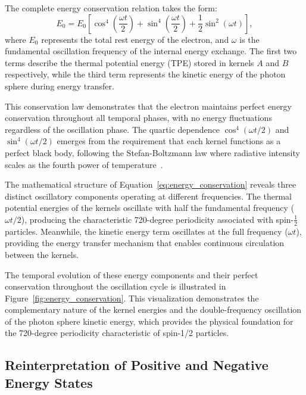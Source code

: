 \documentclass[%
 reprint,
 amsmath,amssymb,
 aps,
]{revtex4-1}
\numberwithin{equation}{section}%
\begin{document}
The complete energy conservation relation takes the form:
\begin{equation}
\boxed{E_0 = E_0\left[\cos^4\left(\frac{\omega t}{2}\right) + \sin^4\left(\frac{\omega t}{2}\right) + \frac{1}{2}\sin^2(\omega t)\right]}, \label{eq:energy_conservation}
\end{equation}
where $E_0$ represents the total rest energy of the electron, and $\omega$ is the fundamental oscillation frequency of the internal energy exchange. The first two terms describe the thermal potential energy (TPE) stored in kernels $A$ and $B$ respectively, while the third term represents the kinetic energy of the photon sphere during energy transfer.

This conservation law demonstrates that the electron maintains perfect energy conservation throughout all temporal phases, with no energy fluctuations regardless of the oscillation phase. The quartic dependence $\cos^4(\omega t/2)$ and $\sin^4(\omega t/2)$ emerges from the requirement that each kernel functions as a perfect black body, following the Stefan-Boltzmann law where radiative intensity scales as the fourth power of temperature~\cite{hanamura2501.0130}.

The mathematical structure of Equation~\eqref{eq:energy_conservation} reveals three distinct oscillatory components operating at different frequencies. The thermal potential energies of the kernels oscillate with half the fundamental frequency ($\omega t/2$), producing the characteristic 720-degree periodicity associated with spin-$\frac{1}{2}$ particles. Meanwhile, the kinetic energy term oscillates at the full frequency ($\omega t$), providing the energy transfer mechanism that enables continuous circulation between the kernels.

The temporal evolution of these energy components and their perfect conservation throughout the oscillation cycle is illustrated in Figure~\ref{fig:energy_conservation}. This visualization demonstrates the complementary nature of the kernel energies and the double-frequency oscillation of the photon sphere kinetic energy, which provides the physical foundation for the 720-degree periodicity characteristic of spin-1/2 particles.


\subsection{Reinterpretation of Positive and Negative Energy States} \label{subsec:reinterpretation_positive}
\end{document}
